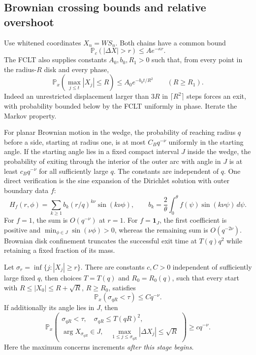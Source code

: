 \documentclass[11pt,letterpaper]{article}
\numberwithin{equation}{section}
\theoremstyle{remark}\newtheorem{remark}[theorem]{Remark}
\newcommand{\PP}{\mathbb P}
\newcommand{\one}{\mathbf 1}
\newcommand{\argu}{\operatorname{arg}}
\begin{document}
\subsection{Brownian crossing bounds and relative overshoot}\label{cps:log:sec:crossings}
Use whitened coordinates $X_n=WS_n$. Both chains have a common bound
\begin{equation}\label{cps:log:eq:tail}
 \PP_c(|\Delta X|>r)\le A e^{-\kappa r}.
\end{equation}
The FCLT also supplies constants $A_0,b_0,R_1>0$ such that, from every
point in the radius-$R$ disk and every phase,
\begin{equation}\label{cps:log:eq:confine}
 \PP_x\left(\max_{j\le t}|X_j|\le R\right)
 \le A_0 e^{-b_0t/R^2}\qquad(R\ge R_1).
\end{equation}
Indeed an unrestricted displacement larger than $3R$ in
$\lceil R^2\rceil$ steps forces an exit, with probability bounded below
by the FCLT uniformly in phase. Iterate the Markov property.

For planar Brownian motion in the wedge, the probability of reaching
radius $q$ before a side, starting at radius one, is at most
$C_Bq^{-\nu}$ uniformly in the starting angle. If the starting angle
lies in a fixed compact interval $J$ inside the wedge, the probability
of exiting through the interior of the outer arc with angle in $J$ is
at least $c_Bq^{-\nu}$ for all sufficiently large $q$. The constants
are independent of $q$. One direct verification is the sine expansion
of the Dirichlet solution with outer boundary data $f$:
\begin{equation}\label{cps:log:eq:brownian}
 H_f(r,\phi)=\sum_{k\ge1}b_k(r/q)^{k\nu}\sin(k\nu\phi),\qquad
 b_k=\frac2\theta\int_0^\theta f(\psi)\sin(k\nu\psi)\,d\psi.
\end{equation}
For $f=1$, the sum is $O(q^{-\nu})$ at $r=1$. For
$f=\one_J$, the first coefficient is positive and
$\min_{\phi\in J}\sin(\nu\phi)>0$, whereas the remaining sum is
$O(q^{-2\nu})$. Brownian disk confinement truncates the successful
exit time at $T(q)q^2$ while retaining a fixed fraction of its mass.

Let $\sigma_r=\inf\{j:|X_j|\ge r\}$. There are constants $c,C>0$
independent of sufficiently large fixed $q$, then choices $T=T(q)$ and
$R_0=R_0(q)$, such that every start with
$R\le|X_0|\le R+\sqrt R$, $R\ge R_0$, satisfies
\begin{equation}\label{cps:log:eq:cross-upper}
 \PP_x(\sigma_{qR}<\tau)\le Cq^{-\nu}.
\end{equation}
If additionally its angle lies in $J$, then
\begin{equation}\label{cps:log:eq:cross-lower}
 \PP_x\left(\begin{array}{l}
 \sigma_{qR}<\tau,\quad \sigma_{qR}\le T(qR)^2,\\
 \argu X_{\sigma_{qR}}\in J,\quad
 \max_{1\le j\le\sigma_{qR}}|\Delta X_j|\le\sqrt R
 \end{array}\right)\ge cq^{-\nu}.
\end{equation}
Here the maximum concerns increments \emph{after this stage begins}.
\end{document}
